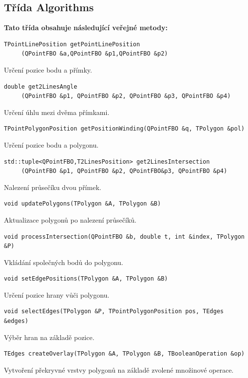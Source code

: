 \documentclass[a4paper, 12pt, oneside, titlepage]{article} %
\begin{document}
\subsection{Třída Algorithms}
\textbf{Tato třída obsahuje následující veřejné metody:}

\begin{verbatim}
TPointLinePosition getPointLinePosition
     (QPointFBO &a,QPointFBO &p1,QPointFBO &p2)
\end{verbatim}
Určení pozice bodu a přímky.

\begin{verbatim}
double get2LinesAngle
     (QPointFBO &p1, QPointFBO &p2, QPointFBO &p3, QPointFBO &p4)
\end{verbatim}
Určení úhlu mezi dvěma přímkami.

\begin{verbatim}
TPointPolygonPosition getPositionWinding(QPointFBO &q, TPolygon &pol)
\end{verbatim}
Určení pozice bodu a polygonu.

\begin{verbatim}
std::tuple<QPointFBO,T2LinesPosition> get2LinesIntersection
     (QPointFBO &p1, QPointFBO &p2, QPointFBO&p3, QPointFBO &p4)
\end{verbatim}
Nalezení průsečíku dvou přímek.

\begin{verbatim}
void updatePolygons(TPolygon &A, TPolygon &B)
\end{verbatim}
Aktualizace polygonů po nalezení průsečíků.

\begin{verbatim}
void processIntersection(QPointFBO &b, double t, int &index, TPolygon &P)
\end{verbatim}
Vkládání společných bodů do polygonu.

\begin{verbatim}
void setEdgePositions(TPolygon &A, TPolygon &B)
\end{verbatim}
Určení pozice hrany vůči polygonu.

\begin{verbatim}
void selectEdges(TPolygon &P, TPointPolygonPosition pos, TEdges &edges)
\end{verbatim}
Výběr hran na základě pozice.

\begin{verbatim}
TEdges createOverlay(TPolygon &A, TPolygon &B, TBooleanOperation &op)
\end{verbatim}
Vytvoření překryvné vrstvy polygonů na základě zvolené množinové operace.
\end{document}
